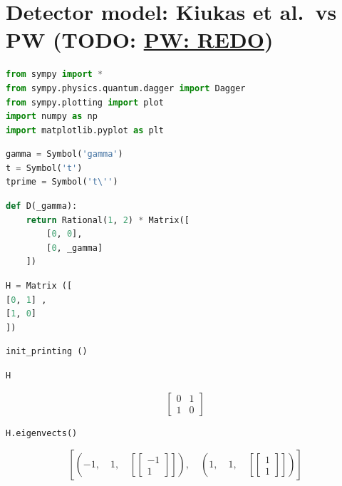 \hypertarget{detector-model-kiukas-et-al.vs-pw}{%
\section{ Detector model: Kiukas et al.~vs PW (TODO: {\color{red}\underline{PW: REDO}}) }
\label{detector-model-kiukas-et-al.vs-pw}}

\begin{lstlisting}[language=Python]
from sympy import *
from sympy.physics.quantum.dagger import Dagger
from sympy.plotting import plot
import numpy as np
import matplotlib.pyplot as plt
\end{lstlisting}

\begin{lstlisting}[language=Python]
gamma = Symbol('gamma')
t = Symbol('t')
tprime = Symbol('t\'')
\end{lstlisting}

\begin{lstlisting}[language=Python]
def D(_gamma):
    return Rational(1, 2) * Matrix([
        [0, 0],
        [0, _gamma]
    ])
\end{lstlisting}

\begin{lstlisting}[language=Python]
H = Matrix ([
[0, 1] ,
[1, 0]
])
\end{lstlisting}

\begin{lstlisting}[language=Python]
init_printing ()
\end{lstlisting}

\begin{lstlisting}[language=Python]
H
\end{lstlisting}

\[\left[\begin{matrix}0 & 1\\1 & 0\end{matrix}\right]\]

\begin{lstlisting}[language=Python]
H.eigenvects()
\end{lstlisting}

\[\left [ \left ( -1, \quad 1, \quad \left [ \left[\begin{matrix}-1\\1\end{matrix}\right]\right ]\right ), \quad \left ( 1, \quad 1, \quad \left [ \left[\begin{matrix}1\\1\end{matrix}\right]\right ]\right )\right ]\]

